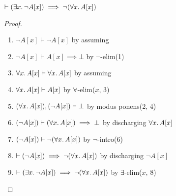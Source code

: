 \begin{node}
$\vdash(\exists x\ldotp\neg A[x])\implies\neg(\forall x\ldotp A[x])$
\end{node}

\begin{proof}
\begin{enumerate}
\item $\neg A[x]\vdash\neg A[x]$
  by assuming%
\item $\neg A[x]\vdash A[x]\implies\bot$ by $\neg$-elim(1)%
\item $\forall x\ldotp A[x]\vdash\forall x\ldotp A[x]$ by assuming%
\item $\forall x\ldotp A[x]\vdash A[x]$ by $\forall$-elim($x$, 3)%
\item $(\forall x\ldotp A[x]),(\neg A[x])\vdash\bot$
  by modus ponens(2, 4)%
\item $(\neg A[x])\vdash(\forall x\ldotp A[x]) \implies \bot$
  by discharging $\forall x\ldotp A[x]$%
\item $(\neg A[x])\vdash\neg(\forall x\ldotp A[x])$
  by $\neg$-intro(6)%
\item $\vdash(\neg A[x])\implies\neg(\forall x\ldotp A[x])$
  by discharging $\neg A[x]$%
\item $\vdash(\exists x\ldotp\neg A[x])\implies\neg(\forall x\ldotp A[x])$
  by $\exists$-elim($x$, 8)\qedhere%
\end{enumerate}
\end{proof}

